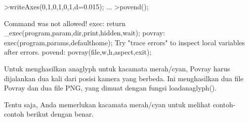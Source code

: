 \documentclass[a4paper,10pt]{article}
\begin{document}
\begin{eulernotebook}
\begin{eulerprompt}
>writeAxes(0,1,0,1,0,1,d=0.015); ...
>povend();
\end{eulerprompt}
\begin{euleroutput}
  Command was not allowed!
  exec:
      return _exec(program,param,dir,print,hidden,wait);
  povray:
      exec(program,params,defaulthome);
  Try "trace errors" to inspect local variables after errors.
  povend:
      povray(file,w,h,aspect,exit); 
\end{euleroutput}
\begin{eulercomment}
Untuk menghasilkan anaglyph untuk kacamata merah/cyan, Povray harus dijalankan dua kali dari posisi kamera yang
berbeda. Ini menghasilkan dua file Povray dan dua file PNG, yang dimuat dengan fungsi loadanaglyph().

Tentu saja, Anda memerlukan kacamata merah/cyan untuk melihat contoh-contoh berikut dengan benar.


\end{eulercomment}
\end{eulernotebook}
\end{document}
